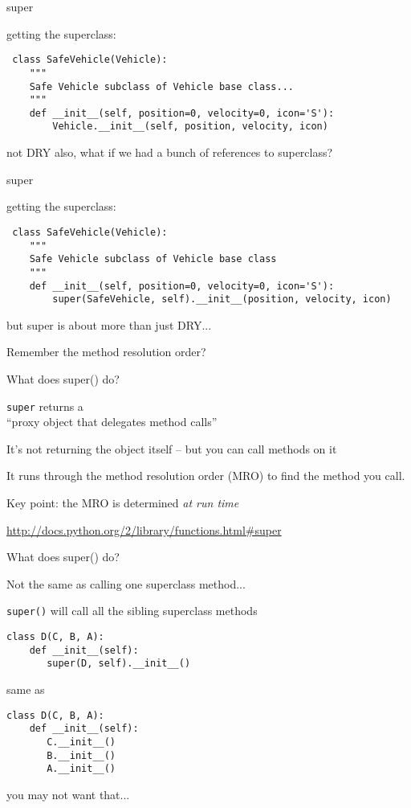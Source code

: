 \documentclass{beamer}
\begin{document}
\begin{frame}[fragile]{super}

{\Large getting the superclass:}
\begin{verbatim}
￼class SafeVehicle(Vehicle):
    """
    Safe Vehicle subclass of Vehicle base class...
    """
    def __init__(self, position=0, velocity=0, icon='S'):
        Vehicle.__init__(self, position, velocity, icon)
\end{verbatim}

{\Large
\vfill
not DRY
\vfill
also, what if we had a bunch of references to superclass?
}
\end{frame} 

\begin{frame}[fragile]{super}

{\Large getting the superclass:}
\begin{verbatim}
￼class SafeVehicle(Vehicle):
    """
    Safe Vehicle subclass of Vehicle base class
    """
    def __init__(self, position=0, velocity=0, icon='S'):
        super(SafeVehicle, self).__init__(position, velocity, icon)
\end{verbatim}

\vfill
{\Large but super is about more than just DRY...}

\vfill
{\Large Remember the method resolution order?}
\end{frame} 


\begin{frame}[fragile]{What does super() do?}

\vfill
{\Large \verb|super| returns a \\
``proxy object that delegates method calls''}

\vfill
{\Large It's not returning the object itself -- but you can call methods on it}

\vfill
{\Large It runs through the method resolution order (MRO) to find the method you call.}

\vfill
{\Large Key point: the MRO is determined \emph{at run time} }

\vfill
\url{http://docs.python.org/2/library/functions.html#super}

\end{frame} 

\begin{frame}[fragile]{What does super() do?}

\vfill
{\Large Not the same as calling one superclass method...}

\vfill
{\Large \verb|super()| will call all the sibling superclass methods}

\begin{verbatim}
class D(C, B, A):
    def __init__(self):
       super(D, self).__init__()
\end{verbatim}
same as
\begin{verbatim}
class D(C, B, A):
    def __init__(self):
       C.__init__()
       B.__init__()
       A.__init__()
\end{verbatim}

{\Large you may not want that...}

\end{frame} 
\end{document}
